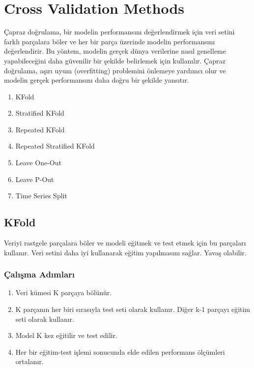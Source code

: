 \section{Cross Validation Methods}
Çapraz doğrulama, bir modelin performansını değerlendirmek için veri setini farklı parçalara böler ve her bir parça üzerinde modelin performansını değerlendirir. Bu yöntem, modelin gerçek dünya verilerine nasıl genelleme yapabileceğini daha güvenilir bir şekilde belirlemek için kullanılır. Çapraz doğrulama, aşırı uyum (overfitting) problemini önlemeye yardımcı olur ve modelin gerçek performansını daha doğru bir şekilde yansıtır.

\begin{enumerate}
    \item KFold
    \item Stratified KFold
    \item Repeated KFold
    \item Repeated Stratified KFold
    \item Leave One-Out
    \item Leave P-Out
    \item Time Series Split
\end{enumerate}

\newpage

\subsection{KFold}
Veriyi rastgele parçalara böler ve modeli eğitmek ve test etmek için bu parçaları kullanır. Veri setini daha iyi kullanarak eğitim yapılmasını sağlar. Yavaş olabilir.

\subsubsection{Çalışma Adımları}
\begin{enumerate}
    \item Veri kümesi K parçaya bölünür.
    \item K parçanın her biri sırasıyla test seti olarak kullanır. Diğer k-1 parçayı eğitim seti olarak kullanır. 
    \item Model K kez eğitilir ve test edilir.
    \item Her bir eğitim-test işlemi sonucunda elde edilen performans ölçümleri ortalanır.
\end{enumerate}

